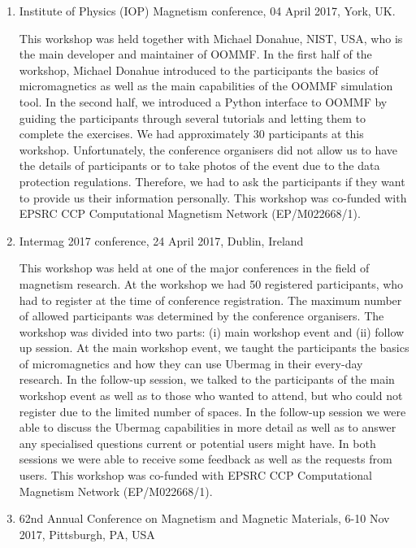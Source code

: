 \documentclass{deliverablereport}
\begin{document}
\begin{enumerate}

\item Institute of Physics (IOP) Magnetism conference, 04 April 2017,
York, UK.

  This workshop was held together with Michael Donahue, NIST, USA, who
is the main developer and maintainer of OOMMF. In the first half of
the workshop, Michael Donahue introduced to the participants the
basics of micromagnetics as well as the main capabilities of the OOMMF
simulation tool. In the second half, we introduced a Python interface
to OOMMF by guiding the participants through several tutorials and
letting them to complete the exercises. We had approximately 30
participants at this workshop. Unfortunately, the conference
organisers did not allow us to have the details of participants or to
take photos of the event due to the data protection
regulations. Therefore, we had to ask the participants if they want to
provide us their information personally. This workshop was co-funded
with EPSRC CCP Computational Magnetism Network (EP/M022668/1).

\item Intermag 2017 conference, 24 April 2017, Dublin, Ireland

  This workshop was held at one of the major conferences in the field
of magnetism research. At the workshop we had 50 registered
participants, who had to register at the time of conference
registration. The maximum number of allowed participants was
determined by the conference organisers. The workshop was divided into
two parts: (i) main workshop event and (ii) follow up session. At the
main workshop event, we taught the participants the basics of
micromagnetics and how they can use Ubermag in their every-day
research. In the follow-up session, we talked to the participants of
the main workshop event as well as to those who wanted to attend, but
who could not register due to the limited number of spaces. In the
follow-up session we were able to discuss the Ubermag capabilities in
more detail as well as to answer any specialised questions current or
potential users might have. In both sessions we were able to receive
some feedback as well as the requests from users. This workshop was
co-funded with EPSRC CCP Computational Magnetism Network
(EP/M022668/1).

\item 62nd Annual Conference on Magnetism and Magnetic Materials, 6-10
Nov 2017, Pittsburgh, PA, USA


\end{enumerate}
\end{document}
